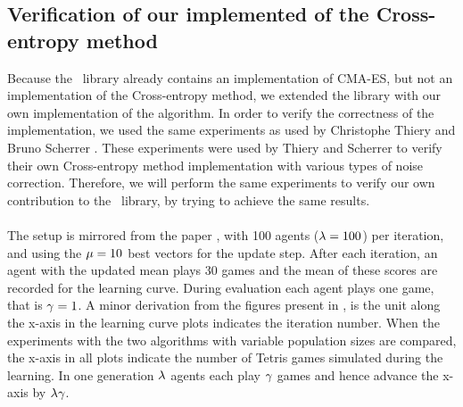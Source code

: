 \subsection{Verification of our implemented of the Cross-entropy method \label{varifyofce}}

Because the \shark\ library already contains an implementation of 
CMA-ES, but not an implementation of the Cross-entropy method, we extended the library
with our own implementation of the algorithm.
In order to verify the correctness of the implementation, 
we used the same experiments as used by 
Christophe Thiery and Bruno Scherrer \citep{scherrer2009}. 
These experiments were used by Thiery and Scherrer to 
verify their own Cross-entropy method implementation with various types of noise correction. 
Therefore, we will perform the same experiments to verify our 
own contribution to the \shark\  library, by trying to achieve the same results.\\
\\
The setup is mirrored from the paper \citep{scherrer2009}, 
with 100 agents ($\lambda = 100$) per iteration,
and using the $\mu = 10$ best vectors
for the update step. After each iteration, 
an agent with the updated mean 
plays 30 games and the mean of these scores are recorded for the
learning curve.
During evaluation each agent plays one game, that is $\gamma = 1$.
A minor derivation from the figures present in \citep{scherrer2009}, is 
the unit along the x-axis in the learning curve plots indicates 
the iteration number. When the experiments with the two algorithms
with variable population sizes are compared, the x-axis in all plots
indicate the number of Tetris games simulated during the learning. In one 
generation $\lambda$ agents each play $\gamma$ games and hence
advance the x-axis by $\lambda \gamma$.\\

